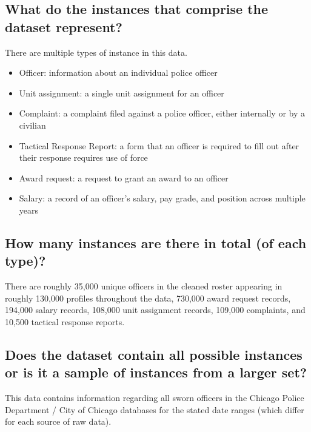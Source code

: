 \documentclass[letterpaper, 10 pt, conference]{ieeeconf}  %
\begin{document}
\subsection{What do the instances that comprise the dataset represent?}
There are multiple types of instance in this data. 
\begin{itemize}
\item Officer: information about an individual police officer
\item Unit assignment: a single unit assignment for an officer
\item Complaint: a complaint filed against a police officer, either internally or by a civilian
\item Tactical Response Report: a form that an officer is required to fill out after their response requires use of force
\item Award request: a request to grant an award to an officer
\item Salary: a record of an officer's salary, pay grade, and position across multiple years
\end{itemize}

\subsection{How many instances are there in total (of each type)?}
There are roughly 35,000 unique officers in the cleaned roster appearing in roughly 130,000 profiles throughout the data,
730,000 award request records,
194,000 salary records,
108,000 unit assignment records,
109,000 complaints,
and 10,500 tactical response reports.

\subsection{Does the dataset contain all possible instances or is it a sample of instances from a larger set?}
This data contains information regarding all sworn officers in the Chicago Police Department / City of Chicago
databases for the stated date ranges (which differ for each source of raw data).
\end{document}

